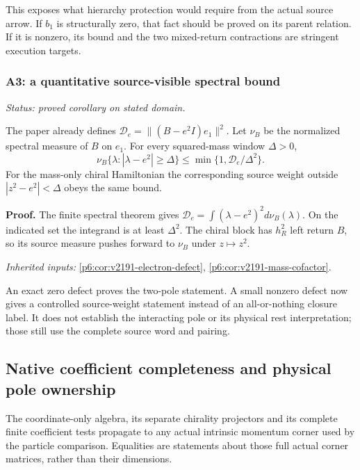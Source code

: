 \documentclass[12pt,a4paper]{article}
\begin{document}
This exposes what hierarchy protection would require from the actual
source arrow. If \(b_1\) is structurally zero, that fact should be proved
on its parent relation. If it is nonzero, its bound and the two mixed-return
contractions are stringent execution targets.

\subsubsection{A3: a quantitative source-visible spectral bound}
\label{p6:sec:v2201-derived-a3}
\noindent\textit{Status: proved corollary on stated domain.}

The paper already defines
\(\mathcal D_e=\|(B-e^2I)e_1\|^2\). Let \(\nu_B\) be the normalized
spectral measure of \(B\) on \(e_1\). For every squared-mass window
\(\Delta>0\),
\[
\boxed{\nu_B\{\lambda:|\lambda-e^2|\ge\Delta\}
 \le\min\{1,\mathcal D_e/\Delta^2\}.}
\]
For the mass-only chiral Hamiltonian the corresponding source weight outside
\(|z^2-e^2|<\Delta\) obeys the same bound.

\textbf{Proof.} The finite spectral theorem gives
\(\mathcal D_e=\int(\lambda-e^2)^2d\nu_B(\lambda)\). On the indicated set
the integrand is at least \(\Delta^2\). The chiral block has
\(h_R^2\) left return \(B\), so its source measure pushes forward to
\(\nu_B\) under \(z\mapsto z^2\).
\par\noindent\textit{Inherited inputs:} \ref{p6:cor:v2191-electron-defect}, \ref{p6:cor:v2191-mass-cofactor}.

An exact zero defect proves the two-pole statement. A small nonzero defect
now gives a controlled source-weight statement instead of an all-or-nothing
closure label. It does not establish the interacting pole or its physical
rest interpretation; those still use the complete source word and pairing.


\subsection{Native coefficient completeness and physical pole ownership}
\label{p5b:sec:v226-pole-coefficients}
The coordinate-only algebra, its separate chirality projectors and its
complete finite coefficient tests propagate to any actual intrinsic
momentum corner used by the particle comparison. Equalities are statements
about those full actual corner matrices, rather than their dimensions.
\end{document}
